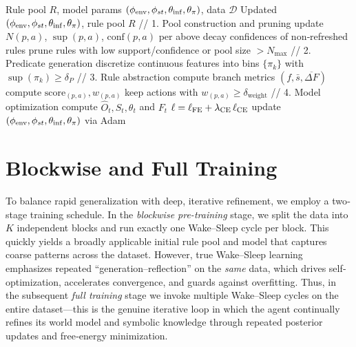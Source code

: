 \documentclass{article} %
\begin{document}
\begin{algorithm}[htbp]
\caption{Sleep Phase: Model \& Rule Refinement}
\label{alg:sleep-phase}
\begin{algorithmic}[1]
\Require Rule pool \(R\), model params \((\phi_{\rm env},\phi_{st},\theta_{\rm inf},\theta_\pi)\), data \(\mathcal D\)
\Ensure Updated \((\phi_{\rm env},\phi_{st},\theta_{\rm inf},\theta_\pi)\), rule pool \(R\)
\State // 1. Pool construction and pruning
  \State update \(N(p,a)\), \(\sup(p,a)\), \(\mathrm{conf}(p,a)\) per above
\EndFor
\State decay confidences of non‐refreshed rules
\State prune rules with low support/confidence or pool size $>N_{\max}$
\State // 2. Predicate generation
\State discretize continuous features into bins \(\{\pi_k\}\) with \(\sup(\pi_k)\ge\delta_P\)
\State // 3. Rule abstraction
  \State compute branch metrics \((f,\bar s,\overline{\Delta F})\)
  \State compute \(\mathrm{score}_{(p,a)},w_{(p,a)}\)
  \State keep actions with \(w_{(p,a)}\ge\delta_{\mathrm{weight}}\)
\EndFor
\State // 4. Model optimization
    \State compute \(\hat O_t,S_t,\theta_t\) and \(F_t\)
  \EndFor
  \State \(\ell=\ell_{\rm FE}+\lambda_{\rm CE}\,\ell_{\rm CE}\)
  \State update \((\phi_{\rm env},\phi_{st},\theta_{\rm inf},\theta_\pi)\) via Adam
\EndFor
\end{algorithmic}
\end{algorithm}


\section{Blockwise and Full Training}
\label{Sec:F}
To balance rapid generalization with deep, iterative refinement, we employ a two‐stage training schedule.  In the \emph{blockwise pre-training} stage, we split the data into $K$ independent blocks and run exactly one Wake–Sleep cycle per block.  This quickly yields a broadly applicable initial rule pool and model that captures coarse patterns across the dataset.  However, true Wake–Sleep learning emphasizes repeated “generation–reflection” on the \emph{same} data, which drives self‐optimization, accelerates convergence, and guards against overfitting.  Thus, in the subsequent \emph{full training} stage we invoke multiple Wake–Sleep cycles on the entire dataset—this is the genuine iterative loop in which the agent continually refines its world model and symbolic knowledge through repeated posterior updates and free‐energy minimization.  
\end{document}
